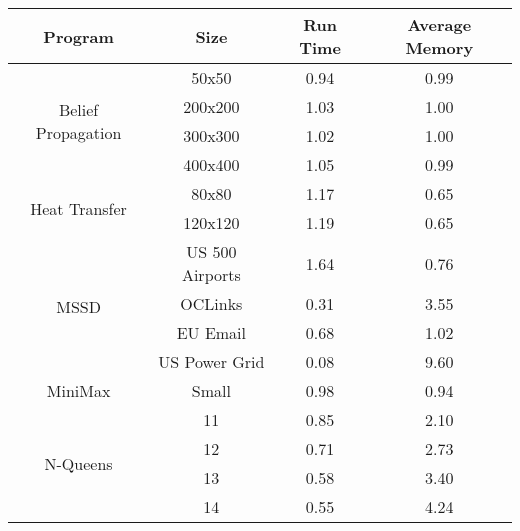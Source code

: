 \begin{tabular}{c | c || c | c} \hline
	\textbf{Program} & \textbf{Size} & \textbf{Run Time} & \textbf{Average Memory}\\ \hline \hline
	\multirow{4}{*}{Belief Propagation}  & 50x50 &  0.94  &  0.99
  \\
		 & 200x200 &  1.03  &  1.00
  \\
		 & 300x300 &  1.02  &  1.00
  \\
		 & 400x400 &  1.05  &  0.99
  \\
	\hline
	\multirow{2}{*}{Heat Transfer}  & 80x80 &  1.17  &  0.65
  \\
		 & 120x120 &  1.19  &  0.65
  \\
	\hline
	\multirow{4}{*}{MSSD}  & US 500 Airports &  1.64  &  0.76
  \\
		 & OCLinks &  0.31  &  3.55
  \\
		 & EU Email &  0.68  &  1.02
  \\
		 & US Power Grid &  0.08  &  9.60
  \\
	\hline
	MiniMax  & Small &  0.98  &  0.94
  \\
	\hline
	\multirow{4}{*}{N-Queens}  & 11 &  0.85  &  2.10
  \\
		 & 12 &  0.71  &  2.73
  \\
		 & 13 &  0.58  &  3.40
  \\
		 & 14 &  0.55  &  4.24
  \\
	\hline
\end{tabular}
